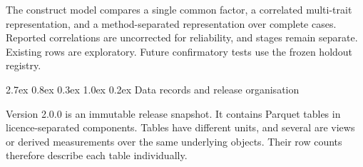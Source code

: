 \documentclass[
  10pt,
]{article}
\makeatletter
\renewcommand\section{\@startsection{section}{1}{\z@}%
  {2.7ex \@plus 0.8ex \@minus 0.3ex}%
  {1.0ex \@plus 0.2ex}%
  {\normalfont\Large\sffamily\bfseries\color{OSGInk}}}
\makeatother
\begin{document}
The construct model compares a single common factor, a correlated
multi-trait representation, and a method-separated representation over
complete cases. Reported correlations are uncorrected for reliability,
and stages remain separate. Existing rows are exploratory. Future
confirmatory tests use the frozen holdout registry.

\section{Data records and release
organisation}\label{6-data-records-and-release-organization}

Version 2.0.0 is an immutable release snapshot. It contains
\OSGClaimReleaseParquetTables{} Parquet tables in
\OSGClaimReleaseComponents{} licence-separated components. Tables have
different units, and several are views or derived measurements over the
same underlying objects. Their row counts therefore describe each table
individually.
\end{document}
